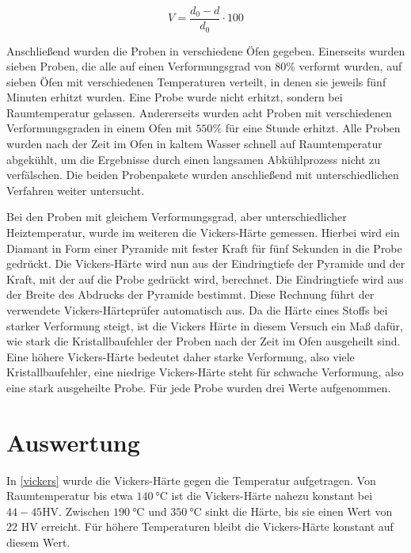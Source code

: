 \documentclass[
	a4paper,
	12pt,
	pagesize,
	ngerman
]{scrartcl}
\begin{document}
\begin{equation}
V = \frac{d_0-d}{d_0} \cdot 100
\label{eq:ver}
\end{equation}

Anschließend wurden die Proben in verschiedene Öfen gegeben. Einerseits wurden sieben Proben, die alle auf einen Verformungsgrad von $80\%$ verformt wurden, auf sieben Öfen mit verschiedenen Temperaturen verteilt, in denen sie jeweils fünf Minuten erhitzt wurden. Eine Probe wurde nicht erhitzt, sondern bei Raumtemperatur gelassen. Andererseits wurden acht Proben mit verschiedenen Verformungsgraden in einem Ofen mit $550\%$ für eine Stunde erhitzt. Alle Proben wurden nach der Zeit im Ofen in kaltem Wasser schnell auf Raumtemperatur abgekühlt, um die Ergebnisse durch einen langsamen Abkühlprozess nicht zu verfälschen. Die beiden Probenpakete wurden anschließend mit unterschiedlichen Verfahren weiter untersucht.

Bei den Proben mit gleichem Verformungsgrad, aber unterschiedlicher Heiztemperatur, wurde im weiteren die Vickers-Härte gemessen. Hierbei wird ein Diamant in Form einer Pyramide mit fester Kraft für fünf Sekunden in die Probe gedrückt. Die Vickers-Härte wird nun aus der Eindringtiefe der Pyramide und der Kraft, mit der auf die Probe gedrückt wird, berechnet. Die Eindringtiefe wird aus der Breite des Abdrucks der Pyramide bestimmt. Diese Rechnung führt der verwendete Vickers-Härteprüfer automatisch aus. Da die Härte eines Stoffs bei starker Verformung steigt, ist die Vickers Härte in diesem Versuch ein Maß dafür, wie stark die Kristallbaufehler der Proben nach der Zeit im Ofen ausgeheilt sind. Eine höhere Vickers-Härte bedeutet daher starke Verformung, also viele Kristallbaufehler, eine niedrige Vickers-Härte steht für schwache Verformung, also eine stark ausgeheilte Probe. Für jede Probe wurden drei Werte aufgenommen.

\section{Auswertung}

In \cref{vickers} wurde die Vickers-Härte gegen die Temperatur aufgetragen. Von Raumtemperatur bis etwa $\SI{140}{\degreeCelsius}$ ist die Vickers-Härte nahezu konstant bei $44-45$HV. Zwischen $\SI{190}{\degreeCelsius}$ und $\SI{350}{\degreeCelsius}$ sinkt die Härte, bis sie einen Wert von $22$ HV erreicht. Für höhere Temperaturen bleibt die Vickers-Härte konstant auf diesem Wert.
\end{document}
